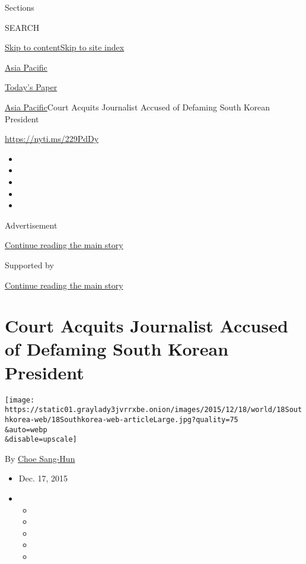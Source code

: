 Sections

SEARCH

\protect\hyperlink{site-content}{Skip to
content}\protect\hyperlink{site-index}{Skip to site index}

\href{https://www.nytimes3xbfgragh.onion/section/world/asia}{Asia
Pacific}

\href{https://myaccount.nytimes3xbfgragh.onion/auth/login?response_type=cookie\&client_id=vi}{}

\href{https://www.nytimes3xbfgragh.onion/section/todayspaper}{Today's
Paper}

\href{/section/world/asia}{Asia Pacific}\textbar{}Court Acquits
Journalist Accused of Defaming South Korean President

\url{https://nyti.ms/229PdDy}

\begin{itemize}
\item
\item
\item
\item
\item
\end{itemize}

Advertisement

\protect\hyperlink{after-top}{Continue reading the main story}

Supported by

\protect\hyperlink{after-sponsor}{Continue reading the main story}

\hypertarget{court-acquits-journalist-accused-of-defaming-south-korean-president}{%
\section{Court Acquits Journalist Accused of Defaming South Korean
President}\label{court-acquits-journalist-accused-of-defaming-south-korean-president}}

\texttt{[image: https://static01.graylady3jvrrxbe.onion/images/2015/12/18/world/18Southkorea-web/18Southkorea-web-articleLarge.jpg?quality=75\\\&auto=webp\\\&disable=upscale]}

By \href{http://www.nytimes3xbfgragh.onion/by/choe-sang-hun}{Choe
Sang-Hun}

\begin{itemize}
\item
  Dec. 17, 2015
\item
  \begin{itemize}
  \item
  \item
  \item
  \item
  \item
  \end{itemize}
\end{itemize}

